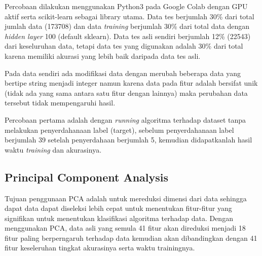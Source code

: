 Percobaan dilakukan menggunakan Python3 pada Google Colab dengan GPU aktif serta scikit-learn sebagai library utama. Data tes berjumlah 30\% dari total jumlah data (173708) dan data \textit{training} berjumlah 30\% dari total data dengan \textit{hidden layer} 100 (default sklearn). Data tes asli sendiri berjumlah 12\% (22543) dari keseluruhan data, tetapi data tes yang digunakan adalah 30\% dari total karena memiliki akurasi yang lebih baik daripada data tes asli.

Pada data sendiri ada modifikasi data dengan merubah beberapa data yang bertipe string menjadi integer namun karena data pada fitur adalah bersifat unik (tidak ada yang sama antara satu fitur dengan lainnya) maka perubahan data tersebut tidak mempengaruhi hasil.


Percobaan pertama adalah dengan \textit{running} algoritma terhadap dataset tanpa melakukan penyerdahanaan label (target), sebelum penyerdahanaan label berjumlah 39 setelah penyerdahaan berjumlah 5, kemudian didapatkanlah hasil waktu \textit{training} dan akurasinya.




\subsection{Principal Component Analysis}

Tujuan penggunaan PCA adalah untuk mereduksi dimensi dari data sehingga dapat data dapat diseleksi lebih cepat untuk menentukan fitur-fitur yang signifikan untuk menentukan klasifikasi algoritma terhadap data. Dengan menggunakan PCA, data asli yang semula 41 fitur akan direduksi menjadi 18 fitur paling berperngaruh terhadap data kemudian akan dibandingkan dengan 41 fitur keseleruhan tingkat akurasinya serta waktu trainingnya.


